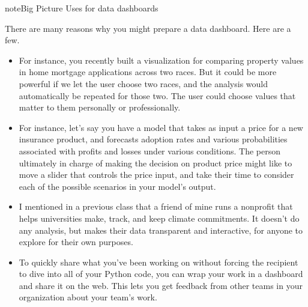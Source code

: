\documentclass[letterpaper,10pt,english]{sphinxmanual}
\begin{document}
\begin{sphinxadmonition}{note}{Big Picture \sphinxhyphen{} Uses for data dashboards}

There are many reasons why you might prepare a data dashboard.  Here are a few.
\begin{itemize}
\item {} 
  For instance, you recently built a visualization for comparing property values in home mortgage applications across two races.  But it could be more powerful if we let the user choose two races, and the analysis would automatically be repeated for those two.  The user could choose values that matter to them personally or professionally.

\item {} 
  For instance, let’s say you have a model that takes as input a price for a new insurance product, and forecasts adoption rates and various probabilities associated with profits and losses under various conditions.  The person ultimately in charge of making the decision on product price might like to move a slider that controls the price input, and take their time to consider each of the possible scenarios in your model’s output.

\item {} 
  I mentioned in a previous class that a friend of mine runs a nonprofit that helps universities make, track, and keep climate commitments.    It doesn’t do any analysis, but makes their data transparent and interactive, for anyone to explore for their own purposes.

\item {} 
  To quickly share what you’ve been working on without forcing the recipient to dive into all of your Python code, you can wrap your work in a dashboard and share it on the web.  This lets you get feedback from other teams in your organization about your team’s work.

\end{itemize}
\end{sphinxadmonition}
\end{document}
